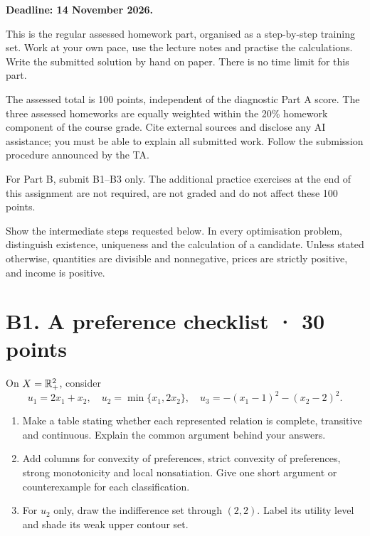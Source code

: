 \textbf{Deadline: 14 November 2026.}

This is the regular assessed homework part, organised as a step-by-step training set. Work at your own pace, use the lecture notes and practise the calculations. Write the submitted solution by hand on paper. There is no time limit for this part.

The assessed total is 100 points, independent of the diagnostic Part A score. The three assessed homeworks are equally weighted within the 20\% homework component of the course grade. Cite external sources and disclose any AI assistance; you must be able to explain all submitted work. Follow the submission procedure announced by the TA.

For Part B, submit B1--B3 only. The additional practice exercises at the end of this assignment are not required, are not graded and do not affect these 100 points.

Show the intermediate steps requested below. In every optimisation problem, distinguish existence, uniqueness and the calculation of a candidate. Unless stated otherwise, quantities are divisible and nonnegative, prices are strictly positive, and income is positive.
\section*{B1. A preference checklist · 30 points}
On $X=\mathbb R_+^2$, consider
\[
 u_1=2x_1+x_2,\quad
 u_2=\min\{x_1,2x_2\},\quad
 u_3=-(x_1-1)^2-(x_2-2)^2.
\]
\begin{enumerate}[label=(\alph*)]
\item Make a table stating whether each represented relation is complete, transitive and continuous. Explain the common argument behind your answers.
\item Add columns for convexity of preferences, strict convexity of preferences, strong monotonicity and local nonsatiation. Give one short argument or counterexample for each classification.
\item For $u_2$ only, draw the indifference set through $(2,2)$. Label its utility level and shade its weak upper contour set.
\end{enumerate}

\clearpage
